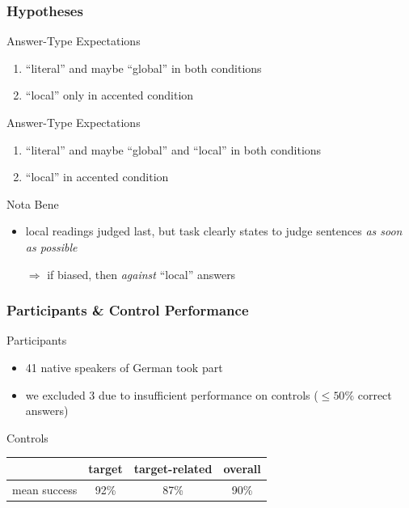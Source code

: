 \documentclass[fleqn,10pt,xcolor=dvipsnames]{beamer}
\newcommand{\mymark}[1]{{\color{mycol}{#1}}}
\begin{document}
\begin{frame}
  \frametitle{Hypotheses}

  \begin{block}{\mymark{Traditionalist} Answer-Type Expectations}
    \begin{enumerate}
    \item ``literal'' and maybe ``global'' in both conditions
    \item ``local'' only in accented condition
    \end{enumerate}
  \end{block}

  \begin{block}{\mymark{Heretic} Answer-Type Expectations}
    \begin{enumerate}
    \item ``literal'' and maybe ``global'' and
      ``local'' in both conditions
    \item ``local'' in accented condition
    \end{enumerate}
  \end{block}

  \begin{block}{Nota Bene}
    \begin{itemize}
    \item local readings judged last, but task clearly states to judge
      sentences \emph{as soon as possible}
    \item[$\Rightarrow$] if biased, then \emph{against} ``local'' answers
    \end{itemize}
  \end{block}

\end{frame}

\begin{frame}
  \frametitle{Participants \& Control Performance}

  \begin{block}{Participants}
    \begin{itemize}
    \item 41 native speakers of German took part
    \item we excluded 3 due to insufficient performance on controls
      ($\le 50\%$ correct answers)
    \end{itemize}
  \end{block}

  \begin{block}{Controls}
        \begin{center}
      \begin{tabular}{lccc}
        & target & target-related & overall \\ \midrule
        mean success & 92\% & 87\% & 90\% \\
      \end{tabular}
    \end{center}
  \end{block}
  

\end{frame}
\end{document}
